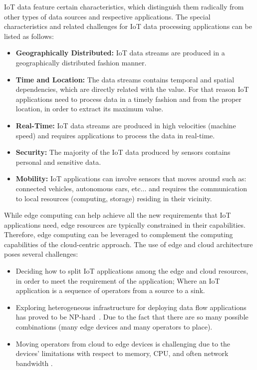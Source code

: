 IoT data feature certain characteristics, which distinguish them radically from other types of data sources and respective applications. The special characteristics and related challenges for IoT data processing applications can be listed as follows:

\begin{itemize}

\item{\textbf{Geographically Distributed:}} IoT data streams are produced in a geographically distributed fashion manner.

\item{\textbf{Time and Location:}} The data streams contains temporal and spatial dependencies, which are directly related with the value. For that reason IoT applications need to process data in a timely fashion and from the proper location, in order to extract its maximum value.

\item{\textbf{Real-Time:}} IoT data streams are produced in high velocities (machine speed) and requires applications to process the data in real-time. 

\item{\textbf{Security:}} The majority of the IoT data produced by sensors contains personal and sensitive data.

\item{\textbf{Mobility:}} IoT applications can involve sensors that moves around such as: connected vehicles, autonomous cars, etc... and requires the communication to local resources (computing, storage) residing in their vicinity. 

\end{itemize}

While edge computing can help achieve all the new requirements that IoT applications need, edge resources are typically constrained in their capabilities. Therefore, edge computing can be leveraged to complement the computing capabilities of the cloud-centric approach. The use of edge and cloud architecture poses several challenges: 

\begin{itemize}
\item Deciding how to split IoT applications among the edge and cloud resources, in order to meet the requirement of the application; Where an IoT application is a sequence of operators from a source to a sink. 

\item Exploring heterogeneous infrastructure for deploying data flow applications has proved to be NP-hard~\cite{Benoit:2013}. Due to the fact that there are so many possible combinations (many edge devices and many operators to place). 
 
\item Moving operators from cloud to edge devices is challenging due to the devices' limitations with respect to memory, CPU, and often network bandwidth \cite{dias:2018:survey}.
\end{itemize}

